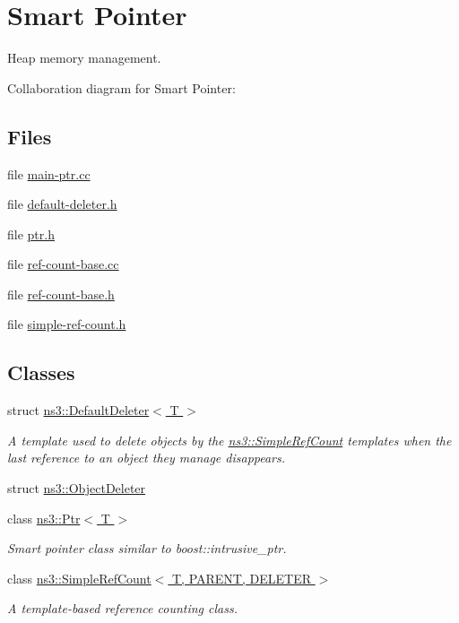 \hypertarget{group__ptr}{}\section{Smart Pointer}
\label{group__ptr}


Heap memory management.  


Collaboration diagram for Smart Pointer\+:
\subsection*{Files}
\begin{DoxyCompactItemize}
\item 
file \hyperlink{main-ptr_8cc}{main-\/ptr.\+cc}
\item 
file \hyperlink{default-deleter_8h}{default-\/deleter.\+h}
\item 
file \hyperlink{ptr_8h}{ptr.\+h}
\item 
file \hyperlink{ref-count-base_8cc}{ref-\/count-\/base.\+cc}
\item 
file \hyperlink{ref-count-base_8h}{ref-\/count-\/base.\+h}
\item 
file \hyperlink{simple-ref-count_8h}{simple-\/ref-\/count.\+h}
\end{DoxyCompactItemize}
\subsection*{Classes}
\begin{DoxyCompactItemize}
\item 
struct \hyperlink{structns3_1_1DefaultDeleter}{ns3\+::\+Default\+Deleter$<$ T $>$}
\begin{DoxyCompactList}\small\item\em A template used to delete objects by the \hyperlink{classns3_1_1SimpleRefCount}{ns3\+::\+Simple\+Ref\+Count} templates when the last reference to an object they manage disappears. \end{DoxyCompactList}\item 
struct \hyperlink{structns3_1_1ObjectDeleter}{ns3\+::\+Object\+Deleter}
\item 
class \hyperlink{classns3_1_1Ptr}{ns3\+::\+Ptr$<$ T $>$}
\begin{DoxyCompactList}\small\item\em Smart pointer class similar to {\ttfamily boost\+::intrusive\+\_\+ptr}. \end{DoxyCompactList}\item 
class \hyperlink{classns3_1_1SimpleRefCount}{ns3\+::\+Simple\+Ref\+Count$<$ T, P\+A\+R\+E\+N\+T, D\+E\+L\+E\+T\+E\+R $>$}
\begin{DoxyCompactList}\small\item\em A template-\/based reference counting class. \end{DoxyCompactList}\end{DoxyCompactItemize}
